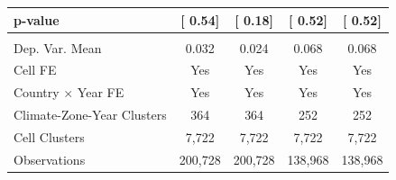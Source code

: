 {\begin{tabular}{l*{4}{c}}
\hspace{15pt} p-value&[     0.54]         &[     0.18]         &[     0.52]         &[     0.52]         \\
\hline \\ Dep. Var. Mean& 0.032         & 0.024         & 0.068         & 0.068         \\
Cell FE             &   Yes         &   Yes         &   Yes         &   Yes         \\
Country $\times$ Year FE&   Yes         &   Yes         &   Yes         &   Yes         \\
Climate-Zone-Year Clusters&   364         &   364         &   252         &   252         \\
Cell Clusters       & 7,722         & 7,722         & 7,722         & 7,722         \\
Observations        &200,728         &200,728         &138,968         &138,968         \\
\bottomrule
\end{tabular}
}
